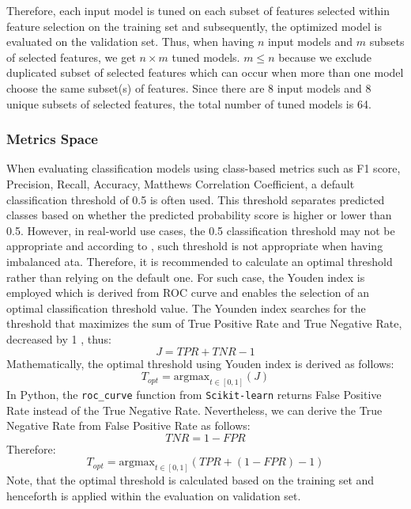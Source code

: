 \vspace{-1em}
Therefore, each input model is tuned on each subset of features selected within feature selection on the training set and subsequently, the optimized model is evaluated on the validation set. Thus, when having $n$ input models and $m$ subsets of selected features, we get $n \times m$ tuned models.
$m \leq n$ because we exclude duplicated subset of selected features which can occur when more than one model choose the same subset(s) of features.
Since there are 8 input models and 8 unique subsets of selected features, the total number of tuned models is 64.

\subsubsection{Metrics Space}

When evaluating classification models using class-based metrics such as F1 score, Precision, Recall, Accuracy, Matthews Correlation Coefficient, a default classification threshold of 0.5 is often used. This threshold separates predicted classes based on whether the predicted probability score is higher or lower than 0.5.
However, in real-world use cases, the 0.5 classification threshold may not be appropriate and according to \citep{esposito2021ghost}, such threshold is not appropriate when having imbalanced ata. Therefore, it is recommended to calculate an optimal threshold rather than relying on the default one.
For such case, the Youden index is employed which is derived from ROC curve and enables the selection of an optimal classification threshold value. 
The Younden index searches for the threshold that maximizes the sum of True Positive Rate and True Negative Rate, decreased by 1 \citep{fluss2005estimation}, thus:
\begin{equation}\label{eq}
J = TPR + TNR - 1
\end{equation}
Mathematically, the optimal threshold using Youden index is derived as follows:
\begin{equation}\label{eq}
T_{opt} = \text{argmax}_{t \in [0, 1]}\left(J\right)
\end{equation}
In Python, the \lstinline{roc_curve} function from \lstinline{Scikit-learn} returns False Positive Rate instead of the True Negative Rate. Nevertheless, we can derive the True Negative Rate from False Positive Rate as follows:
\begin{equation}\label{eq}
TNR =  1-FPR
\end{equation}
Therefore:
\begin{equation}\label{eq}
T_{opt} = \text{argmax}_{t \in [0, 1]}\left(TPR +  \left(1-FPR\right) - 1\right)
\end{equation}
Note, that the optimal threshold is calculated based on the training set and henceforth is applied within the evaluation on validation set.

